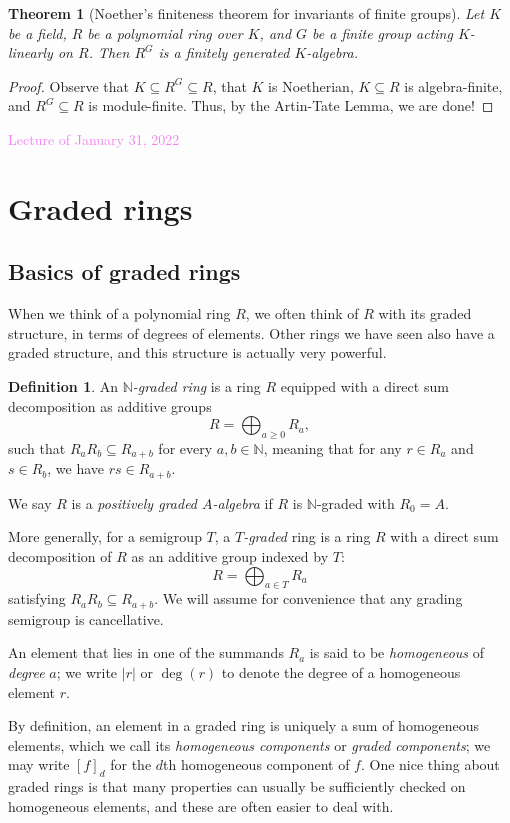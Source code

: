 \documentclass{amsart}[12pt]
\newcommand{\Jan}[1]{\textcolor{violet}{Lecture of January #1, 2022}}
\newcommand{\N}{\mathbb{N}}
\newcommand{\DEF}[1]{\emph{#1}\index{#1}}
\newcommand{\Def}[1]{#1 \index{#1}}
\numberwithin{equation}{section}
\theoremstyle{plain} %
\newtheorem{theorem}[equation]{Theorem}
\theoremstyle{definition}
\newtheorem{definition}[equation]{Definition}
\theoremstyle{remark}
\newcommand{\ssec}[1]{\subsection{#1}}
\begin{document}
\begin{theorem}[Noether's finiteness theorem for invariants of finite groups]
Let $K$ be a field, $R$ be a polynomial ring over $K$, and $G$ be a finite group acting $K$-linearly on $R$. Then $R^G$ is a finitely generated $K$-algebra.
\end{theorem}

\begin{proof}
Observe that $K \subseteq R^G \subseteq R$, that $K$ is Noetherian, $K\subseteq R$ is algebra-finite, and $R^G\subseteq R$ is module-finite. Thus, by the Artin-Tate Lemma, we are done!
\end{proof}

\Jan{31}

\section{Graded rings} 

\ssec{Basics of graded rings}

When we think of a polynomial ring $R$, we often think of $R$ with its graded structure, in terms of degrees of elements. Other rings we have seen also have a graded structure, and this structure is actually very powerful.


\begin{definition}
An \emph{$\N$-graded ring} is a ring $R$ equipped with a direct sum decomposition as additive groups
		\[R=\bigoplus_{a \geqslant 0} R_a,\]
	such that $R_a R_b \subseteq R_{a+b}$ for every $a,b \in \mathbb{N}$, meaning that for any $r\in R_a$ and $s\in R_b$, we have $rs\in R_{a+b}$. 
	
	We say $R$ is a \DEF{positively graded $A$-algebra} if $R$ is $\N$-graded with $R_0=A$.
	
	More generally, for a semigroup $T$, a {\em $T$-graded} ring is a ring $R$ with a direct sum decomposition of $R$ as an additive group indexed by $T$:
	\[R=\bigoplus_{a\in T} R_a\]
	satisfying $R_a R_b \subseteq R_{a+b}$. We will assume for convenience that any grading semigroup is cancellative.

	An element that lies in one of the summands $R_a$ is said to be {\em homogeneous} of {\em degree} $a$; we write $|r|$ or $\deg(r)$ to denote the degree of a homogeneous element $r$.
\end{definition}


By definition, an element in a graded ring is uniquely a sum of homogeneous elements, which we call its {\em homogeneous components}  or {\em graded components}; we may write \Def{$[f]_d$} for the $d$th homogeneous component of $f$.  One nice thing about graded rings is that many properties can usually be sufficiently checked on homogeneous elements, and these are often easier to deal with.
\end{document}
